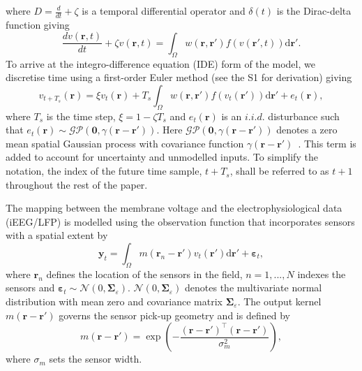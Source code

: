 \documentclass[10pt]{article}
\begin{document}
where $D=\frac{d}{dt} + \zeta$ is a temporal differential operator and $\delta(t)$ is the Dirac-delta function giving 
\begin{equation}
	\label{FinalFormContinuous} 
	\frac{dv\left( \mathbf{r},t \right)}{dt} + \zeta v\left( \mathbf{r},t \right) = \int_\Omega {w\left( \mathbf{r},\mathbf{r}' \right)f\left( {v\left( \mathbf{r}',t \right)} \right)\textrm{d}\mathbf{r}'}. 
\end{equation}
To arrive at the integro-difference equation (IDE) form of the model, we discretise time using a first-order Euler method (see the S1 for derivation) giving 
\begin{equation}
	\label{DiscreteTimeModel} 
	v_{t+T_s}\left(\mathbf{r}\right) = 
	\xi v_t\left(\mathbf{r}\right) + 
	T_s \int_\Omega { 
	    w\left(\mathbf{r},\mathbf{r}'\right)
	    f\left(v_t\left(\mathbf{r}'\right)\right) 
	\textrm{d}\mathbf{r}'} 
	+ e_t\left(\mathbf{r}\right), 
\end{equation}
where $T_s$ is the time step, $\xi = 1-\zeta T_s$ and $e_t(\mathbf{r})$ is an $i.i.d.$ disturbance such that $e_t(\mathbf{r})\sim\mathcal{GP}(\mathbf 0,\gamma(\mathbf{r}-\mathbf{r}'))$. Here $\mathcal{GP}(\mathbf 0,\gamma(\mathbf{r}-\mathbf{r}'))$ denotes a zero mean spatial Gaussian process with covariance function $\gamma(\mathbf{r}-\mathbf{r}')$~\cite{Rasmussen2005}. This term is added to account for uncertainty and unmodelled inputs. To simplify the notation, the index of the future time sample, $t+T_s$, shall be referred to as $t+1$ throughout the rest of the paper. 

The mapping between the membrane voltage and the electrophysiological data (iEEG/LFP) is modelled using the observation function that incorporates sensors with a spatial extent by
\begin{equation}
    \label{eq:ObservationEquation}
	\mathbf{y}_t =
	\int_{\Omega}{
	    m\left(\mathbf{r}_n-\mathbf{r}'\right)v_t\left(\mathbf{r}'\right)
	\textrm{d}\mathbf{r}'} + 
	\boldsymbol{\varepsilon}_t, 
\end{equation}
where $\mathbf{r}_n$ defines the location of the sensors in the field, $n=1,...,N$ indexes the sensors and $\boldsymbol{\varepsilon}_t \sim \mathcal{N}\left(0,\boldsymbol{\Sigma}_{\varepsilon}\right)$. $\mathcal{N}\left(0,\boldsymbol{\Sigma}_{\varepsilon}\right)$ denotes the multivariate normal distribution with mean zero and covariance matrix $\boldsymbol{\Sigma}_{\varepsilon}$. The output kernel $m(\mathbf{r}-\mathbf{r}')$ governs the sensor pick-up geometry and is defined by 
\begin{equation}
	m\left(\mathbf{r}-\mathbf{r}'\right) = \exp{\left(-\frac{(\mathbf{r}-\mathbf{r}')^\top(\mathbf{r}-\mathbf{r}')}{\sigma_m^2}\right)},
\end{equation}
where $\sigma_m$ sets the sensor width.
\end{document}
